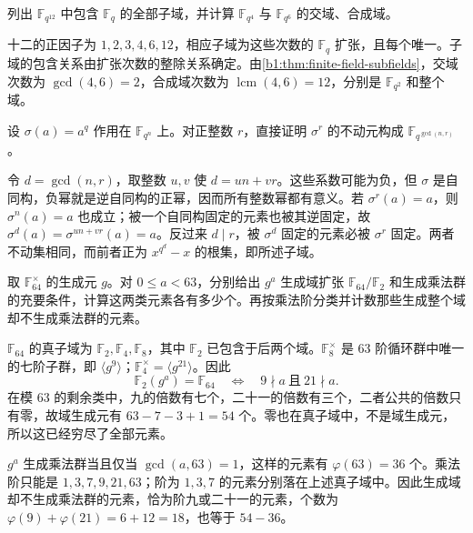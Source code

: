 \begin{exercise}\label{b1:ex:17-subfield-lattice}
	列出 \(\mathbb F_{q^{12}}\) 中包含 \(\mathbb F_q\) 的全部子域，并计算 \(\mathbb F_{q^4}\) 与 \(\mathbb F_{q^6}\) 的交域、合成域。
\end{exercise}
\begin{solution}
	十二的正因子为 \(1,2,3,4,6,12\)，相应子域为这些次数的 \(\mathbb F_q\) 扩张，且每个唯一。子域的包含关系由扩张次数的整除关系确定。由\cref{b1:thm:finite-field-subfields}，交域次数为 \(\gcd(4,6)=2\)，合成域次数为 \(\operatorname{lcm}(4,6)=12\)，分别是 \(\mathbb F_{q^2}\) 和整个域。
\end{solution}

\begin{exercise}\label{b1:ex:17-frobenius-power-fixed}
	设 \(\sigma(a)=a^q\) 作用在 \(\mathbb F_{q^n}\) 上。对正整数 \(r\)，直接证明 \(\sigma^r\) 的不动元构成 \(\mathbb F_{q^{\gcd(n,r)}}\)。
\end{exercise}
\begin{solution}
	令 \(d=\gcd(n,r)\)，取整数 \(u,v\) 使 \(d=un+vr\)。这些系数可能为负，但 \(\sigma\) 是自同构，负幂就是逆自同构的正幂，因而所有整数幂都有意义。若 \(\sigma^r(a)=a\)，则 \(\sigma^n(a)=a\) 也成立；被一个自同构固定的元素也被其逆固定，故 \(\sigma^d(a)=\sigma^{un+vr}(a)=a\)。反过来 \(d\mid r\)，被 \(\sigma^d\) 固定的元素必被 \(\sigma^r\) 固定。两者不动集相同，而前者正为 \(x^{q^d}-x\) 的根集，即所述子域。
\end{solution}

\begin{exercise}\label{b1:ex:17-generators}
	取 \(\mathbb F_{64}^\times\) 的生成元 \(g\)。对 \(0\leq a<63\)，分别给出 \(g^a\) 生成域扩张 \(\mathbb F_{64}/\mathbb F_2\) 和生成乘法群的充要条件，计算这两类元素各有多少个。再按乘法阶分类并计数那些生成整个域却不生成乘法群的元素。
\end{exercise}
\begin{solution}
	\(\mathbb F_{64}\) 的真子域为 \(\mathbb F_2,\mathbb F_4,\mathbb F_8\)，其中 \(\mathbb F_2\) 已包含于后两个域。\(\mathbb F_8^\times\) 是 \(63\) 阶循环群中唯一的七阶子群，即 \(\langle g^9\rangle\)；\(\mathbb F_4^\times=\langle g^{21}\rangle\)。因此
	\[
		\mathbb F_2(g^a)=\mathbb F_{64} \quad\Longleftrightarrow\quad 9\nmid a\ \text{且}\ 21\nmid a.
	\]
	在模 \(63\) 的剩余类中，九的倍数有七个，二十一的倍数有三个，二者公共的倍数只有零，故域生成元有 \(63-7-3+1=54\) 个。零也在真子域中，不是域生成元，所以这已经穷尽了全部元素。

	\(g^a\) 生成乘法群当且仅当 \(\gcd(a,63)=1\)，这样的元素有 \(\varphi(63)=36\) 个。乘法阶只能是 \(1,3,7,9,21,63\)；阶为 \(1,3,7\) 的元素分别落在上述真子域中。因此生成域却不生成乘法群的元素，恰为阶九或二十一的元素，个数为 \(\varphi(9)+\varphi(21)=6+12=18\)，也等于 \(54-36\)。
\end{solution}

